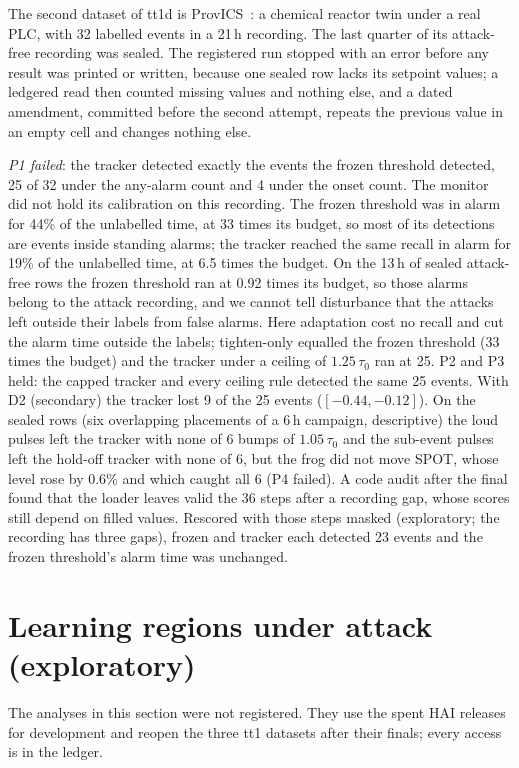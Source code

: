 \documentclass[sigconf]{acmart}
\begin{document}
The second dataset of tt1d is ProvICS~\cite{shibbir2026provics}: a chemical reactor twin under a real
PLC, with 32 labelled events in a 21\,h recording. The last quarter of its attack-free recording was
sealed. The registered run stopped with an error before any result was printed or written, because one
sealed row lacks its setpoint values; a ledgered read then counted missing values and nothing else, and a dated
amendment, committed before the second attempt, repeats the previous value in an empty cell and changes
nothing else.

\emph{P1 failed}: the tracker detected exactly the events the frozen threshold detected, 25 of 32
under the any-alarm count and 4 under the onset count. The monitor did not hold its calibration on
this recording. The frozen threshold was in alarm for 44\% of the unlabelled time, at 33 times its
budget, so most of its detections are events inside standing alarms; the tracker reached the same
recall in alarm for 19\% of the unlabelled time, at 6.5 times the budget. On the 13\,h of sealed
attack-free rows the frozen threshold ran at 0.92 times its budget, so those alarms belong to the attack
recording, and we cannot tell disturbance that the attacks left outside their labels from false alarms.
Here adaptation cost no recall and cut the alarm time outside the labels; tighten-only equalled the
frozen threshold (33 times the budget) and the tracker under a ceiling of $1.25\,\tau_0$ ran at 25. P2
and P3 held: the capped tracker and every ceiling rule detected the same 25 events. With D2
(secondary) the tracker lost 9 of the 25 events ($[-0.44, -0.12]$). On
the sealed rows (six overlapping placements of a 6\,h campaign, descriptive) the loud pulses left the
tracker with none of 6 bumps of $1.05\,\tau_0$ and the sub-event pulses left the hold-off tracker with
none of 6, but the frog did not move SPOT, whose level rose by 0.6\% and which caught all 6 (P4 failed).
A code audit after the final found that the loader leaves valid the 36 steps after a recording gap,
whose scores still depend on filled values. Rescored with those steps masked (exploratory; the
recording has three gaps), frozen and tracker each detected 23 events and the frozen threshold's alarm
time was unchanged.

\section{Learning regions under attack (exploratory)}
\label{sec:regions}

The analyses in this section were not registered. They use the spent HAI releases for development
and reopen the three tt1 datasets after their finals; every access is in the ledger.
\end{document}
